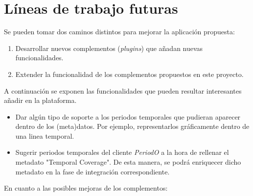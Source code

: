 \section{Líneas de trabajo futuras}

Se pueden tomar dos caminos distintos para mejorar la aplicación
propuesta:

\begin{enumerate}
\def\labelenumi{\arabic{enumi}.}
\tightlist
\item
  Desarrollar nuevos complementos (\emph{plugins}) que añadan nuevas
  funcionalidades.
\item
  Extender la funcionalidad de los complementos propuestos en este
  proyecto.
\end{enumerate}

A continuación se exponen las funcionalidades que pueden resultar
interesantes añadir en la plataforma.

\begin{itemize}
\tightlist
\item
  Dar algún tipo de soporte a los periodos temporales que pudieran
  aparecer dentro de los (meta)datos. Por ejemplo, representarlos
  gráficamente dentro de una linea temporal.
\item
  Sugerir periodos temporales del cliente \emph{PeriodO} a la hora de
  rellenar el metadato "Temporal Coverage". De esta manera, se podrá
  enriquecer dicho metadato en la fase de integración correspondiente.
\end{itemize}

En cuanto a las posibles mejoras de los complementos:

